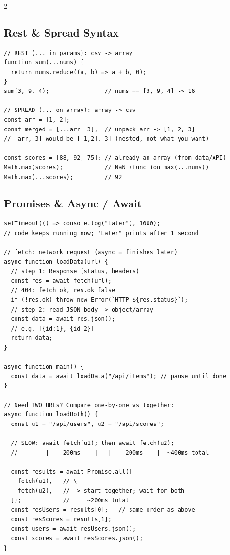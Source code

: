 \documentclass{article}
\begin{document}
\begin{multicols}{2}
\subsection{Rest \& Spread Syntax}
\begin{lstlisting}[style=jsexam]
// REST (... in params): csv -> array
function sum(...nums) {
  return nums.reduce((a, b) => a + b, 0);
}
sum(3, 9, 4);                // nums == [3, 9, 4] -> 16

// SPREAD (... on array): array -> csv
const arr = [1, 2];
const merged = [...arr, 3];  // unpack arr -> [1, 2, 3]
// [arr, 3] would be [[1,2], 3] (nested, not what you want)

const scores = [88, 92, 75]; // already an array (from data/API)
Math.max(scores);            // NaN (function max(...nums))
Math.max(...scores);         // 92
\end{lstlisting}

\subsection{Promises \& Async / Await}
\begin{lstlisting}[style=jsexam]
setTimeout(() => console.log("Later"), 1000);
// code keeps running now; "Later" prints after 1 second

// fetch: network request (async = finishes later)
async function loadData(url) {
  // step 1: Response (status, headers)
  const res = await fetch(url);
  // 404: fetch ok, res.ok false
  if (!res.ok) throw new Error(`HTTP ${res.status}`);
  // step 2: read JSON body -> object/array
  const data = await res.json();
  // e.g. [{id:1}, {id:2}]
  return data;
}

async function main() {
  const data = await loadData("/api/items"); // pause until done
}

// Need TWO URLs? Compare one-by-one vs together:
async function loadBoth() {
  const u1 = "/api/users", u2 = "/api/scores";

  // SLOW: await fetch(u1); then await fetch(u2);
  //        |--- 200ms ---|   |--- 200ms ---|  ~400ms total

  const results = await Promise.all([
    fetch(u1),   // \
    fetch(u2),   //  > start together; wait for both
  ]);            //     ~200ms total
  const resUsers = results[0];   // same order as above
  const resScores = results[1];
  const users = await resUsers.json();
  const scores = await resScores.json();
}
\end{lstlisting}

\end{multicols}
\end{document}
